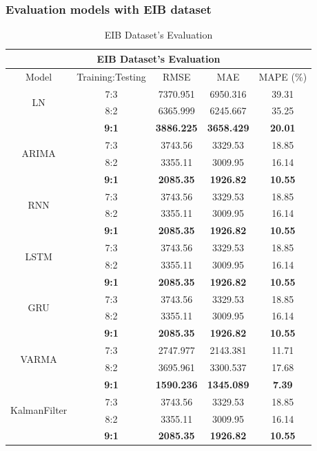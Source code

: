 \subsubsection{Evaluation models with EIB dataset}
\begin{table}[H]
    \centering
    \caption{EIB Dataset's Evaluation}
    \begin{tabular}{|c|c|c|c|c|}
         \hline
         \multicolumn{5}{|c|}{\textbf{EIB Dataset's Evaluation}}\\
         \hline
         \centering Model & Training:Testing & RMSE & MAE & MAPE (\%)\\
         \hline
         \multirow{2}{*}{LN} & 7:3 & 7370.951&6950.316&39.31 \\ & 8:2 & 6365.999&6245.667&35.25 \\ & \textbf{9:1} & \textbf{3886.225} & \textbf{3658.429} & \textbf{20.01}\\
         \hline
         \multirow{2}{*}{ARIMA} & 7:3 & 3743.56&3329.53&18.85\\ & 8:2 & 3355.11&3009.95&16.14 \\ & \textbf{9:1} & \textbf{2085.35} & \textbf{1926.82} & \textbf{10.55}\\
         \hline
         \multirow{2}{*}{RNN} & 7:3 & 3743.56&3329.53&18.85\\ & 8:2 & 3355.11&3009.95&16.14 \\ & \textbf{9:1} & \textbf{2085.35} & \textbf{1926.82} & \textbf{10.55}\\
         \hline
         \multirow{2}{*}{LSTM} & 7:3 & 3743.56&3329.53&18.85\\ & 8:2 & 3355.11&3009.95&16.14 \\ & \textbf{9:1} & \textbf{2085.35} & \textbf{1926.82} & \textbf{10.55}\\
         \hline
         \multirow{2}{*}{GRU} & 7:3 & 3743.56&3329.53&18.85\\ & 8:2 & 3355.11&3009.95&16.14 \\ & \textbf{9:1} & \textbf{2085.35} & \textbf{1926.82} & \textbf{10.55}\\
         \hline
         \multirow{2}{*}{VARMA} & 7:3 & 2747.977&2143.381&11.71\\ & 8:2 & 3695.961&3300.537&17.68 \\ & \textbf{9:1} & \textbf{1590.236} & \textbf{1345.089} & \textbf{7.39}\\       
         \hline
         \multirow{2}{*}{KalmanFilter} & 7:3 & 3743.56&3329.53&18.85\\ & 8:2 & 3355.11&3009.95&16.14 \\ & \textbf{9:1} & \textbf{2085.35} & \textbf{1926.82} & \textbf{10.55}\\

\end{tabular}
\end{table}
